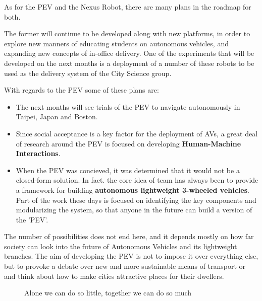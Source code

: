 As for the PEV and the Nexus Robot, there are many plans in the roadmap for both.

The former will continue to be developed along with new platforms, in order to explore new manners of educating students on autonomous vehicles, and expanding new concepts of in-office delivery. One of the experiments that will be developed on the next months is a deployment of a number of these robots to be used as the delivery system of the City Science group.

With regards to the PEV some of these plans are:
\begin{itemize}
  \item The next months will see trials of the PEV to navigate autonomously in Taipei, Japan and Boston.

  \item Since social acceptance is a key factor for the deployment of AVs, a great deal of research around the PEV is focused on developing \textbf{Human-Machine Interactions}.

  \item When the PEV was concieved, it was determined that it would not be a closed-form solution. In fact. the core idea of team has always been to provide a framework for building \textbf{autonomous lightweight 3-wheeled vehicles}. Part of the work these days is focused on identifying the key components and modularizing the system, so that anyone in the future can build a version of the 'PEV'.
\end{itemize}

The number of possibilities does not end here, and it depends mostly on how far society can look into the future of Autonomous Vehicles and its lightweight branches. The aim of developing the PEV is not to impose it over everything else, but to provoke a debate over new and more sustainable means of transport or and think about how to make cities attractive places for their dwellers.

\begin{figure}[b!]
  \centering
  \caption[The power of a team]{Alone we can do so little, together we can do so much}
\end{figure}